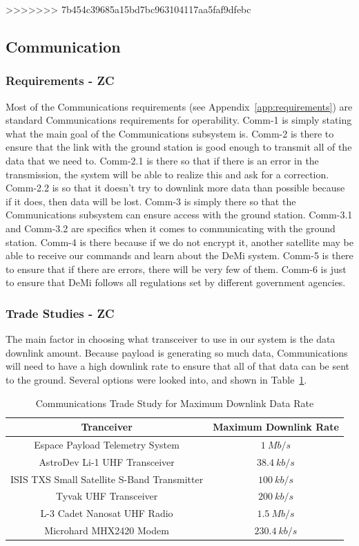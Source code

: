 \documentclass[12pt]{article}
\begin{document}
>>>>>>> 7b454c39685a15bd7bc963104117aa5faf9dfebc
		\subsection{Communication}

			\subsubsection{Requirements - ZC}

Most of the Communications requirements (see Appendix~\ref{app:requirements}) are standard Communications requirements for operability. Comm-1 is simply stating what the main goal of the Communications subsystem is. Comm-2 is there to ensure that the link with the ground station is good enough to transmit all of the data that we need to. Comm-2.1 is there so that if there is an error in the transmission, the system will be able to realize this and ask for a correction. Comm-2.2 is so that it doesn’t try to downlink more data than possible because if it does, then data will be lost. Comm-3 is simply there so that the Communications subsystem can ensure access with the ground station. Comm-3.1 and Comm-3.2 are specifics when it comes to communicating with the ground station. Comm-4 is there because if we do not encrypt it, another satellite may be able to receive our commands and learn about the DeMi system. Comm-5 is there to ensure that if there are errors, there will be very few of them. Comm-6 is just to ensure that DeMi follows all regulations set by different government agencies.

			\subsubsection{Trade Studies - ZC}\label{sec:comm_tradestudies}
The main factor in choosing what transceiver to use in our system is the data downlink amount. Because payload is generating so much data, Communications will need to have a high downlink rate to ensure that all of that data can be sent to the ground. Several options were looked into, and shown in Table~\ref{table:comm_transceivers}.

\begin{table}[ht]
\caption{Communications Trade Study for Maximum Downlink Data Rate}
\label{table:comm_transceivers}
\begin{center}
    \begin{tabular}{| c | c |} \hline
    	Tranceiver & Maximum Downlink Rate \\ \hline \hline
Espace Payload Telemetry System & $1\ Mb/s$ \\
AstroDev Li-1 UHF Transceiver & $38.4\ kb/s$ \\
ISIS TXS Small Satellite  S-Band Transmitter & $100\ kb/s$ \\
Tyvak UHF Transceiver & $200\ kb/s$ \\
L-3 Cadet Nanosat UHF Radio & $1.5\ Mb/s$ \\
Microhard MHX2420 Modem & $230.4\ kb/s$ \\ \hline 
    \end{tabular}
\end{center}
\end{table}
\end{document}
